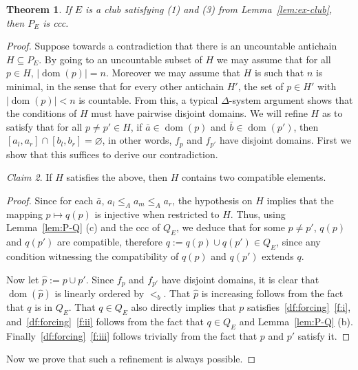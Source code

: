 \documentclass[10pt]{amsart}
\newtheorem{theorem}{Theorem}[section]
\theoremstyle{definition}
\theoremstyle{remark}
\newtheorem{claim}[theorem]{Claim}
\newcommand{\es}{\varnothing}
\newcommand{\seb}{\subseteq}
\newcommand{\ba}{\bar{a}}
\newcommand{\bb}{\bar{b}}
\newcommand{\1}{\mathbbm{1}}
\DeclareMathOperator{\dom}{dom}
\begin{document}
\begin{theorem}
  If $E$ is a club satisfying (1) and (3) from Lemma~\ref{lem:ex-club},
  then $P_{E}$ is ccc.
\end{theorem}
\begin{proof}
  Suppose towards a contradiction that there is
  an uncountable antichain $H \seb P_{E}$. By going to an uncountable subset of $H$
  we may assume that for all $p \in H$, $|\dom(p)| = n$. Moreover
  we may assume that $H$ is such that $n$ is minimal, in the
  sense that for every other antichain $H'$, the set of $p \in H'$
  with $|\dom(p)| < n$ is countable. From this, a typical
  $\Delta$-system argument shows that the conditions of $H$ must have
  pairwise disjoint domains.
  We will refine $H$ as to satisfy
  that for all $p \neq p' \in H$, if $\ba \in \dom(p)$ and
  $\bb \in \dom(p')$, then $[a_{l},a_{r}] \cap [b_{l},b_{r}] = \es$,
  in other words, $f_{p}$ and $f_{p'}$ have disjoint domains.
  First we show that this suffices to derive our contradiction.

  \begin{claim}
    If $H$ satisfies the above, then $H$ contains two compatible elements.
  \end{claim}
  \begin{proof}
    Since for each $\ba$, $a_{l} \le_{A} a_{m} \le_{A} a_{r}$, the hypothesis
    on $H$ implies that the mapping $p \mapsto q(p)$ is injective when restricted to $H$.
    Thus, using Lemma~\ref{lem:P-Q} (c) and the ccc of $Q_{E}$, we deduce
    that for some $p \neq p'$,
    $q(p)$ and $q(p')$ are compatible, therefore
    $q := q(p) \cup q(p') \in Q_{E}$, since any condition
    witnessing the compatibility of $q(p)$ and $q(p')$ extends $q$.

    Now let $\hat{p} := p \cup p'$. Since $f_{p}$ and $f_{p'}$ have
    disjoint domains, it is clear that $\dom(\hat{p})$ is linearly ordered
    by $<_{b}$. That $\hat{p}$ is increasing follows from the
    fact that $q$ is in $Q_{E}$. That $q \in Q_{E}$ also
    directly implies that $p$ satisfies~\ref{df:forcing}~\ref{f:i},
    and~\ref{df:forcing}~\ref{f:ii}
    follows from the fact that $q \in Q_{E}$ and Lemma~\ref{lem:P-Q} (b).
    Finally~\ref{df:forcing}~\ref{f:iii} follows trivially from the fact that $p$ and $p'$
    satisfy it.
  \end{proof}


  Now we prove that such a refinement is always possible.


\end{proof}
\end{document}
